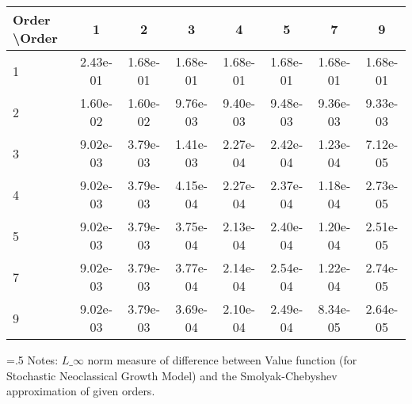 \begin{tabular*}{1.00\textwidth}{@{\extracolsep{\fill}}l|ccccccc} 
 \hline \hline 
 Order \textbackslash Order & 1 & 2 & 3 & 4 & 5 & 7 & 9 \\ 
 \hline 
1 & 2.43e-01 & 1.68e-01 & 1.68e-01 & 1.68e-01 & 1.68e-01 & 1.68e-01 & 1.68e-01 \\ 
 2 & 1.60e-02 & 1.60e-02 & 9.76e-03 & 9.40e-03 & 9.48e-03 & 9.36e-03 & 9.33e-03 \\ 
 3 & 9.02e-03 & 3.79e-03 & 1.41e-03 & 2.27e-04 & 2.42e-04 & 1.23e-04 & 7.12e-05 \\ 
 4 & 9.02e-03 & 3.79e-03 & 4.15e-04 & 2.27e-04 & 2.37e-04 & 1.18e-04 & 2.73e-05 \\ 
 5 & 9.02e-03 & 3.79e-03 & 3.75e-04 & 2.13e-04 & 2.40e-04 & 1.20e-04 & 2.51e-05 \\ 
 7 & 9.02e-03 & 3.79e-03 & 3.77e-04 & 2.14e-04 & 2.54e-04 & 1.22e-04 & 2.74e-05 \\ 
 9 & 9.02e-03 & 3.79e-03 & 3.69e-04 & 2.10e-04 & 2.49e-04 & 8.34e-05 & 2.64e-05 \\ 
 \hline 
 \end{tabular*} 
\begin{minipage}[t]{1.00\textwidth}{\baselineskip=.5\baselineskip \vspace{.3cm} \footnotesize{ 
Notes: $L\_{\infty}$ norm measure of difference between Value function (for Stochastic Neoclassical Growth Model) and the Smolyak-Chebyshev approximation of given orders. \\ 
}} \end{minipage}